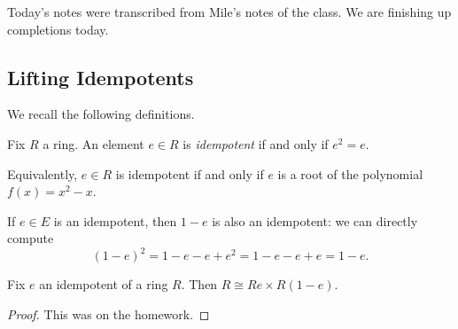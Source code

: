 
Today's notes were transcribed from Mile's notes of the class. We are finishing up completions today.

\subsection{Lifting Idempotents}
We recall the following definitions.
\begin{definition}[Idempotent]
	Fix $R$ a ring. An element $e\in R$ is \textit{idempotent} if and only if $e^2=e$.
\end{definition} %
\begin{remark}
	Equivalently, $e\in R$ is idempotent if and only if $e$ is a root of the polynomial $f(x)=x^2-x$.
\end{remark}
\begin{example}
	If $e\in E$ is an idempotent, then $1-e$ is also an idempotent: we can directly compute
	\[(1-e)^2=1-e-e+e^2=1-e-e+e=1-e.\]
\end{example}
\begin{lemma} \label{lem:basicidempdecomp}
	Fix $e$ an idempotent of a ring $R$. Then $R\cong Re\times R(1-e)$.
\end{lemma}
\begin{proof}
	This was on the homework.
\end{proof}

